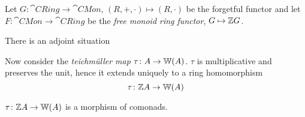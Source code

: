 
Let $G \colon \cat{CRing} \to \cat{CMon}$, $(R,+,\cdot) \mapsto (R,\cdot)$
be the forgetful functor and
let $F \colon \cat{CMon} \to \cat{CRing}$ be the \textit{free monoid ring functor},
$G \mapsto \mathbb{Z} G$.
\begin{proposition} \label{prop: adjunction monoid ring}
    There is an adjoint situation 
\end{proposition}
Now consider the \textit{teichmüller map} $\tau \colon A \to \mathbb{W}(A)$.
$\tau$ is multiplicative and preserves the unit, hence it extends uniquely to 
a ring homomorphism
\[
\tau \colon \mathbb{Z} A \to \mathbb{W}(A)
\]
\begin{theorem} \label{thm: morphism of comonads}
    $\tau \colon \mathbb{Z} A \to \mathbb{W}(A)$ is a morphism of comonads.
\end{theorem}

